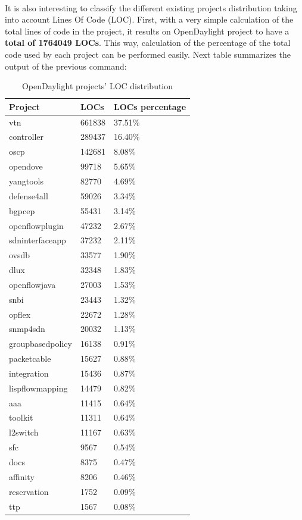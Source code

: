 \documentclass[a4paper, 12pt]{book}
\begin{document}
\\
It is also interesting to classify the different existing projects distribution taking into account Lines Of Code (LOC). First, with a very simple calculation of the total lines of code in the project, it results on OpenDaylight project to have a \textbf{total of 1764049 LOCs}. This way, calculation of the percentage of the total code used by each project can be performed easily. Next table summarizes the output of the previous command:
\begin{table}[H]
\footnotesize
\begin{center}
\begin{tabular}{|l|l|l|}
\hline
\textbf{Project} & \textbf{LOCs} & \textbf{LOCs percentage} \\ \hline
vtn               & 661838 & 37.51\% \\ \hline
controller        & 289437 & 16.40\% \\ \hline
oscp              & 142681 &  8.08\% \\ \hline
opendove          & 99718  &  5.65\% \\ \hline
yangtools         & 82770  &  4.69\% \\ \hline
defense4all       & 59026  &  3.34\% \\ \hline
bgpcep            & 55431  &  3.14\% \\ \hline
openflowplugin    & 47232  &  2.67\% \\ \hline
sdninterfaceapp   & 37232  &  2.11\% \\ \hline
ovsdb             & 33577  &  1.90\% \\ \hline
dlux              & 32348  &  1.83\% \\ \hline
openflowjava      & 27003  &  1.53\% \\ \hline
snbi              & 23443  &  1.32\% \\ \hline
opflex            & 22672  &  1.28\% \\ \hline
snmp4sdn          & 20032  &  1.13\% \\ \hline
groupbasedpolicy  & 16138  &  0.91\% \\ \hline
packetcable       & 15627  &  0.88\% \\ \hline
integration       & 15436  &  0.87\% \\ \hline
lispflowmapping   & 14479  &  0.82\% \\ \hline
aaa               & 11415  &  0.64\% \\ \hline
toolkit           & 11311  &  0.64\% \\ \hline
l2switch          & 11167  &  0.63\% \\ \hline
sfc               & 9567   &  0.54\% \\ \hline
docs              & 8375   &  0.47\% \\ \hline
affinity          & 8206   &  0.46\% \\ \hline
reservation       & 1752   &  0.09\% \\ \hline
ttp               & 1567   &  0.08\% \\ \hline
\end{tabular}
\end{center}
\caption{OpenDaylight projects' LOC distribution}
\label{tab:projectlocdistribution}
\end{table}
\end{document}
